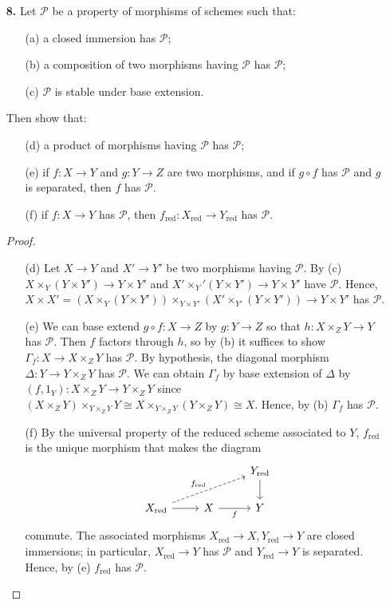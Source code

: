 \documentclass{article}
\begin{document}
\begin{enumerate} [label=\textbf{\arabic*.}, leftmargin=0em]
\item[\textbf{8.}] Let $\mathscr{P}$ be a property of morphisms of schemes such that:
\begin{itemize}
    \item[(a)] a closed immersion has $\mathscr{P}$;
    \item[(b)] a composition of two morphisms having $\mathscr{P}$ has $\mathscr{P}$;
    \item[(c)] $\mathscr{P}$ is stable under base extension.
\end{itemize}
Then show that:
\begin{itemize}
    \item[(d)] a product of morphisms having $\mathscr{P}$ has $\mathscr{P}$;
    \item[(e)] if $f : X \to Y$ and $g : Y \to Z$ are two morphisms, and if $g \circ f$ has $\mathscr{P}$ and $g$ is separated, then $f$ has $\mathscr{P}$.
    \item[(f)] if $f : X \to Y$ has $\mathscr{P}$, then $f_\text{red} : X_\text{red} \to Y_\text{red}$ has $\mathscr{P}$.
\end{itemize}

\begin{proof} $ $ \vspace{0pt}
   \begin{itemize}
    \item[(d)] Let $X \to Y$ and $X' \to Y'$ be two morphisms having $\mathscr{P}$. By (c) $X \times_Y (Y \times Y') \to Y \times Y'$ and $X' \times_Y' (Y \times Y') \to Y \times Y'$ have $\mathscr{P}$. Hence, $X \times X' = (X \times_Y (Y \times Y')) \times_{Y \times Y'} (X' \times_{Y'} (Y \times Y')) \to Y \times Y'$ has $\mathscr{P}$.

    \item[(e)] We can base extend $g \circ f : X \to Z$ by $g : Y \to Z$ so that $h : X \times_Z Y \to Y$ has $\mathscr{P}$. Then $f$ factors through $h$, so by (b) it suffices to show $\Gamma_f : X \to X \times_Z Y$ has $\mathscr{P}$. By hypothesis, the diagonal morphism $\Delta : Y \to Y \times_Z Y$ has $\mathscr{P}$. We can obtain $\Gamma_f$ by base extension of $\Delta$ by $(f, 1_Y) : X \times_Z Y \to Y \times_Z Y$ since $(X \times_Z Y) \times_{Y \times_Z Y} Y \cong X \times_{Y \times_Z Y} (Y \times_Z Y) \cong X$. Hence, by (b) $\Gamma_f$ has $\mathscr{P}$.

    \item[(f)] By the universal property of the reduced scheme associated to $Y$, $f_\text{red}$ is the unique morphism that makes the diagram
    \[\begin{tikzcd}
        &                   & Y_{\text{red}} \arrow[d] \\
    X_{\text{red}} \arrow[r] \arrow[rru, "f_\text{red}", dashed] & X \arrow[r, "f"'] & Y                       
    \end{tikzcd}\]
    commute. The associated morphisms $X_{\text{red}} \to X, Y_{\text{red}} \to Y$ are closed immersions; in particular, $X_\text{red} \to Y$ has $\mathscr{P}$ and $Y_{\text{red}} \to Y$ is separated. Hence, by (e) $f_{\text{red}}$ has $\mathscr{P}$.
   \end{itemize} 


\end{proof}
\end{enumerate}
\end{document}
